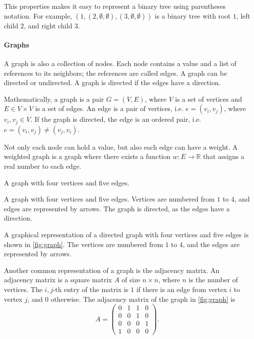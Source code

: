 This properties makes it easy to represent a binary tree using parentheses notation.  For
example, $(1, (2, \emptyset, \emptyset), (3, \emptyset, \emptyset))$ is a binary tree
with root $1$, left child $2$, and right child $3$.

\paragraph{Graphs}  A graph is also a collection of nodes.  Each node contains a value and a
list of references to its neighbors; the references are called edges.  A graph can be
directed or undirected.  A graph is directed if the edges have a direction.

Mathematically, a graph is a pair $G = (V, E)$, where $V$ is a set of vertices and $E \in
V \times V$ is a set of edges.  An edge is a pair of vertices, i.e. $e = (v_i, v_j)$,
where $v_i, v_j \in V$. If the graph is directed, the edge is an ordered pair, i.e. $e =
(v_i, v_j) \neq (v_j, v_i)$.

Not only each node can hold a value, but also each edge can have a weight.  A weighted
graph is a graph where there exists a function $w : E \rightarrow \mathbb{R}$ that assigns
a real number to each edge.

\begin{figurebox}[label=fig:graph]{A graph with four vertices and five edges.}
  \centering
  \tcblower
  A graph with four vertices and five edges.  Vertices are numbered from $1$ to $4$, and
  edges are represented by arrows.  The graph is directed, as the edges have a direction.
\end{figurebox}

A graphical representation of a directed graph with four vertices and five edges is shown
in \cref{fig:graph}.  The vertices are numbered from $1$ to $4$, and the edges are
represented by arrows.

Another common representation of a graph is the adjacency matrix.  An adjacency matrix is
a square matrix $A$ of size $n \times n$, where $n$ is the number of vertices.  The
$i, j$-th entry of the matrix is $1$ if there is an edge from vertex $i$ to vertex $j$,
and $0$ otherwise.  The adjacency matrix of the graph in \cref{fig:graph} is
\[
  A = \begin{pmatrix}
    0 & 1 & 1 & 0 \\
    0 & 0 & 1 & 0 \\
    0 & 0 & 0 & 1 \\
    1 & 0 & 0 & 0
  \end{pmatrix}\text{.}
\]

